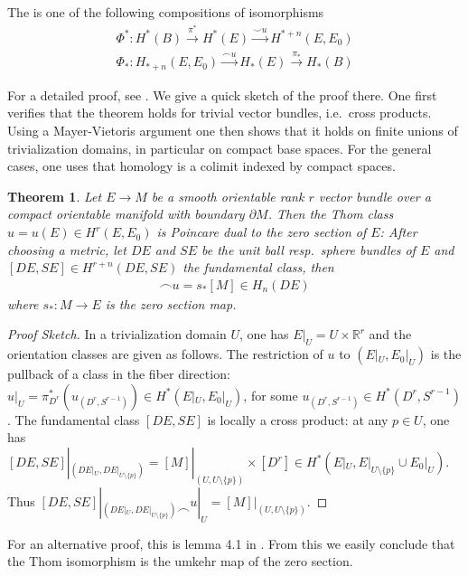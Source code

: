 \documentclass{scrartcl}
\let\emph\relax
\newcommand{\emphi}[1]{\index{#1}\emph{#1}}
\theoremstyle{plain}
\newtheorem{theorem}{Theorem}[section]
\theoremstyle{definition}
\newcommand{\R}{\mathbb R}
\newcommand{\union}{\mathbin{\cup}}
\newcommand{\capp}{\mathbin{\frown}}
\newcommand{\cupp}{\mathbin{\smile}}
\begin{document}
The \emphi{Thom isomorphism} is one of the following compositions of isomorphisms
\begin{align*}
    \Phi^*\colon H^*(B)\xrightarrow{\pi^*}H^*(E)\xrightarrow{\cupp u}H^{*+n}(E, E_0) \\
    \Phi_*\colon H_{*+n}(E, E_0) \xrightarrow{\capp u} H_*(E)\xrightarrow{\pi_*}H_*(B)
\end{align*}

For a detailed proof, see \cite{milnor1974characteristic}. We give a quick sketch of the proof there. One first verifies that the theorem holds for trivial vector bundles, i.e.\ cross products. Using a Mayer-Vietoris argument one then shows that it holds on finite unions of trivialization domains, in particular on compact base spaces. For the general cases, one uses that homology is a colimit indexed by compact spaces.

\begin{theorem}\label{thm:thom_class_dual}
    Let $E\to M$ be a smooth orientable rank $r$ vector bundle over a compact orientable manifold with boundary $\partial M$. Then the Thom class $u=u(E)\in H^r(E, E_0)$ is Poincare dual to the zero section of $E$: After choosing a metric, let $DE$ and $SE$ be the unit ball resp.\ sphere bundles of $E$ and $[DE, SE]\in H^{r+n}(DE, SE)$ the fundamental class, then
    \begin{align*}
        [DE, SE] \capp u = s_*[M]\in H_n(DE)
    \end{align*}
    where $s_*\colon M\to E$ is the zero section map.
\end{theorem}
\begin{proof}[Proof Sketch]
    In a trivialization domain $U$, one has $E|_U = U \times \R^r$ and the orientation classes are given as follows. The restriction of $u$ to $(E|_U, E_0|_U)$ is the pullback of a class in the fiber direction: $u|_U = \pi_{D^r}^{*}\left(u_{(D^r, S^{r-1})}\right)\in H^*(E|_U, E_0|_U)$, for some $u_{(D^r, S^{r-1})}\in H^*(D^r, S^{r-1})$. The fundamental class $[DE, SE]$ is locally a cross product: at any $p\in U$, one has $[DE, SE]|_{(DE|_U, DE|_{U\setminus\{p\}})} = [M]|_{(U, U\setminus\{p\})} \times [D^r] \in H^*(E|_U, E|_{U\setminus\{p\}} \union E_0|_{U})$. Thus $[DE, SE]|_{(DE|_U, DE|_{U\setminus\{p\}})} \capp u|_U = [M]|_{(U, U\setminus\{p\})}$.
\end{proof}
For an alternative proof, this is lemma 4.1 in \cite{hutchings2011cup}. From this we easily conclude that the Thom isomorphism is the umkehr map of the zero section. 
\end{document}
